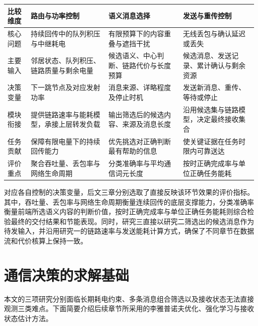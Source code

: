\begin{table}[H]
\centering\small
{}
\label{tab:base:research-map}
\begin{tabularx}{\linewidth}{@{}p{18mm}YYY@{}}
\toprule
比较维度&路由与功率控制&语义消息选择&发送与重传控制\\
\midrule
核心问题&持续回传中的队列积压与中继耗电&有限预算下的内容重叠与遮挡干扰&无线丢包与确认延迟或丢失\\
主要输入&邻居状态、队列积压、链路质量与剩余电量&候选语义、中心判断、链路代价与长度预算&候选消息、发送记录、累计确认与剩余资源\\
决策变量&下一跳节点及对应发射功率&消息来源、详略程度及停止时机&发送新消息、重传、等待或停止\\
模块衔接&提供链路速率与能耗模型，承接上层转发负载&输出筛选后的候选内容、来源及消息长度&沿用候选集与链路模型，决定最终接收集合\\
任务贡献&保障有限电量下的持续回传能力&优先挑选对正确判断最有帮助的信息&使关键证据在任务时限内可靠送达\\
评价重点&聚合吞吐量、丢包率与网络生命周期&分类准确率与平均通信词元长度&按时正确完成率与单位正确任务能耗\\
\bottomrule
\end{tabularx}
\end{table}

对应各自控制的决策变量，后文三章分别选取了直接反映该环节效果的评价指标。其中，吞吐量、丢包率与网络生命周期衡量连续回传的底层支撑能力，分类准确率衡量前端所选语义内容的判断价值，按时正确完成率与单位正确任务能耗则综合检验最终的交付结果和节能表现。同时，研究三直接以研究二筛选出的候选消息作为待发输入，并沿用研究一的链路速率与发送能耗计算方式，确保了不同章节在数据流和代价核算上保持一致。

\section{通信决策的求解基础}

本文的三项研究分别面临长期耗电约束、多条消息组合筛选以及接收状态无法直接观测三类难点。下面简要介绍后续章节所采用的李雅普诺夫优化、强化学习与接收状态估计方法。

